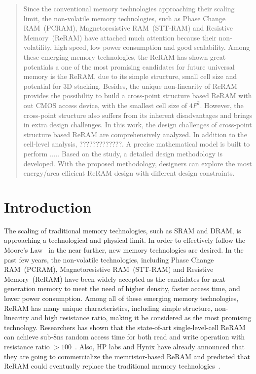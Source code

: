 \begin{abstract}
Since the conventional memory technologies approaching their scaling limit, the non-volatile memory technologies, such as Phase Change RAM~(PCRAM), Magnetoresistive RAM~(STT-RAM) and Resistive Memory~(ReRAM) have attached much attention because their non-volatility, high speed, low power consumption and good scalability. Among these emerging memory technologies, the ReRAM has shown great potentials a one of the most promising candidates for future universal memory is the ReRAM, due to its simple structure, small cell size and potential for 3D stacking. Besides, the unique non-linearity of ReRAM provides the possibility to build a cross-point structure based ReRAM with out CMOS access device, with the smallest cell size of $4F^2$. However, the cross-point structure also suffers from its inherent disadvantages and brings in extra design challenges. In this work, the design challenges of cross-point structure based ReRAM are comprehensively analyzed. In addition to the cell-level analysis, ?????????????. A precise mathematical model is built to perform ..... Based on the study, a detailed design methodology is developed. With the proposed methodology, designers can explore the most energy/area efficient ReRAM design with different design constraints.
\end{abstract}

\vspace{10pt}
\section{Introduction}\label{sec:intro}
The scaling of traditional memory technologies, such as SRAM and DRAM, is approaching a technological and physical limit. In order to effectively follow the Moore's Law~\cite{moore} in the near further, new memory technologies are desired. In the past few years, the non-volatile technologies, including Phase Change RAM~(PCRAM), Magnetoresistive RAM~(STT-RAM) and Resistive Memory~(ReRAM) have been widely accepted as the candidates for next generation memory to meet the need of higher density, faster access time, and lower power consumption. Among all of these emerging memory technologies, ReRAM has many unique characteristics, including simple structure, non-linearity and high resistance ratio, making it be considered as the most promising technology. Researchers has shown that the state-of-art single-level-cell ReRAM can achieve sub-8ns random access time for both read and write operation with resistance ratio $>100$~\cite{memristor:ISSCC2011_ITRI}. Also, HP labs and Hynix have already announced that they are going to commercialize the memristor-based ReRAM and predicted that ReRAM could eventually replace the traditional memory technologies~\cite{memristor:HpHynix}.

